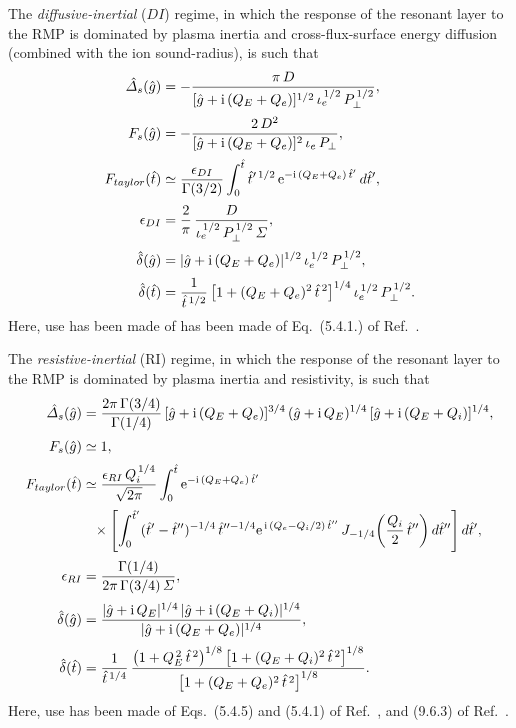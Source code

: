 \documentclass[12pt,prb,aps]{revtex4-1}
\begin{document}
The  {\em diffusive-inertial}\/ ($DI$) regime, in which the response of the resonant layer to the RMP is dominated by plasma inertia and
cross-flux-surface energy diffusion (combined with the ion sound-radius), is such that
\begin{align}
\hat{\mit\Delta}_s(\hat{g})&= -\frac{\pi\,D}{[\hat{g}+{\rm i}\,(Q_E+Q_e)]^{1/2}\,\iota_e^{\,1/2}\,P_\perp^{\,1/2}},\label{di1}\\[0.5ex]
F_s(\hat{g}) &= - \frac{2\,D^2}{[\hat{g}+{\rm i}\,(Q_E+Q_e)]^2\,\iota_e\,P_\perp},\label{di2}\\[0.5ex]
F_{taylor}(\hat{t}) &\simeq\frac{\epsilon_{DI}}{\Gamma(3/2)}\int_0^{\hat{t}}
\hat{t}'^{\,1/2}\,{\rm e}^{-{\rm i}\,(Q_E+Q_e)\,\hat{t}'}\,d\hat{t}', \\[0.5ex]
\epsilon_{DI}& = \frac{2}{\pi}\,\frac{D}{\iota_e^{\,1/2}\,P_\perp^{\,1/2}\,{\mit\Sigma}},\\[0.5ex]
\hat{\delta}(\hat{g}) &= |\hat{g}+{\rm i}\,(Q_E+Q_e)|^{1/2}\,\iota_e^{\,1/2}\,P_\perp^{\,1/2},\label{di3}\\[0.5ex]
\hat{\delta}(\hat{t}) &=\frac{1}{\hat{t}^{\,1/2}}\left[1+(Q_E+Q_e)^2\,\hat{t}^{\,2}\right]^{1/4}\iota_e^{\,1/2}\,P_\perp^{\,1/2}.
\end{align}
Here, use has been made of has been made of Eq.~(5.4.1.) of Ref.~.  

The {\em resistive-inertial}\/  (RI) regime, in which the response of the resonant layer to the RMP is dominated by plasma inertia and
 resistivity, is such that
\begin{align}
\hat{\mit\Delta}_s(\hat{g}) &= \frac{2\pi\,\Gamma(3/4)}{\Gamma(1/4)}\,[\hat{g}+{\rm i}\,(Q_E+Q_e)]^{3/4}\,(\hat{g}
+{\rm i}\,Q_E)^{1/4}\,[\hat{g}+{\rm i}\,(Q_E+Q_i)]^{1/4},\label{ri1}\\[0.5ex]
F_s(\hat{g}) &\simeq 1,\\[0.5ex]
F_{taylor}(\hat{t}) &\simeq \frac{\epsilon_{RI}\,Q_i^{\,1/4}}{\sqrt{2\pi}}\int_0^{\hat{t}}{\rm e}^{-{\rm i}\,(Q_E+Q_e)\,\hat{t}'}\nonumber\\[0.5ex]
&\phantom{=}\times\left[
\int_0^{\hat{t}'}(\hat{t}'-\hat{t}'')^{-1/4}\,\hat{t}''^{-1/4}
{\rm e}^{\,{\rm i}\,(Q_e-Q_i/2)\,\hat{t}''}\,J_{-1/4}\!\left(\frac{Q_i}{2}\,\hat{t}''\right)d\hat{t}''\right]d\hat{t}',\\[0.5ex]
\epsilon_{RI}&= \frac{\Gamma(1/4)}{2\pi\,\Gamma(3/4)\,{\mit\Sigma}},\\[0.5ex]
\hat{\delta} (\hat{g})&= \frac{|\hat{g}+{\rm i}\,Q_E|^{1/4}\,|\hat{g}+{\rm i}\,(Q_E+Q_i)|^{1/4}}{|\hat{g} +{\rm i}\,(Q_E+Q_e)|^{1/4}},\label{ri3}\\[0.5ex]
\hat{\delta}(\hat{t}) &=\frac{1}{\hat{t}^{\,1/4}}\,\frac{\left(1+ Q_E^{\,2}\,\hat{t}^{\,2}\right)^{1/8}\left[1+(Q_E+Q_i)^2\,\hat{t}^{\,2}\right]^{1/8}}
{\left[1+(Q_E+Q_e)^2\,\hat{t}^{\,2}\right]^{1/8}}.
\end{align}
Here, use has been made of Eqs.~(5.4.5) and (5.4.1) of Ref.~, and (9.6.3) of Ref.~.
\end{document}
